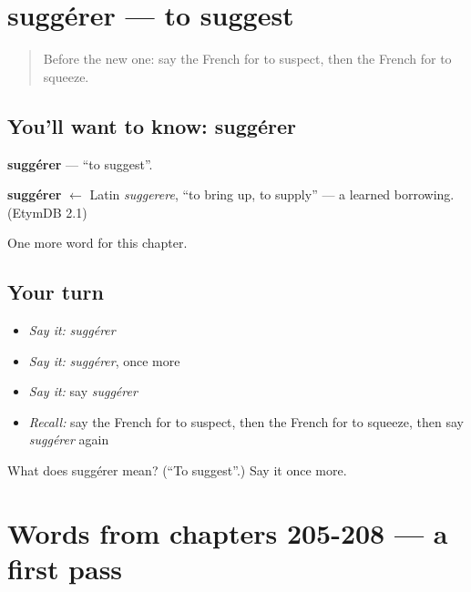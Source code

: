 \section[suggérer]{suggérer — to suggest}

\label{lesson:FR-C213-suggerer}



\begin{quote}
Before the new one: say the French for to suspect, then the French for to squeeze.
\end{quote}

\subsection*{You'll want to know: suggérer}
\textbf{suggérer} — \textquotedblleft{}to suggest\textquotedblright{}.

\begin{cousinweb}
\textbf{suggérer} $\leftarrow$ Latin \emph{suggerere}, \textquotedblleft{}to bring up, to supply\textquotedblright{} — a learned borrowing. (EtymDB 2.1)
\end{cousinweb}

\begin{grammarlens}[title={What you've built}]
One more word for this chapter.
\end{grammarlens}

\subsection*{Your turn}
\begin{itemize}
\raggedright
  \item \emph{Say it:} \emph{suggérer}
  \item \emph{Say it:} \emph{suggérer}, once more
  \item \emph{Say it:} say \emph{suggérer}
  \item \emph{Recall:} say the French for to suspect, then the French for to squeeze, then say \emph{suggérer} again
\end{itemize}

\begin{tcolorbox}[breakable,colback=teal!4,colframe=teal!35!black,title={Before you move on}]
What does suggérer mean? (\textquotedblleft{}To suggest\textquotedblright{}.) Say it once more.
\end{tcolorbox}
\section[(dialogue)]{Words from chapters 205-208 — a first pass}

